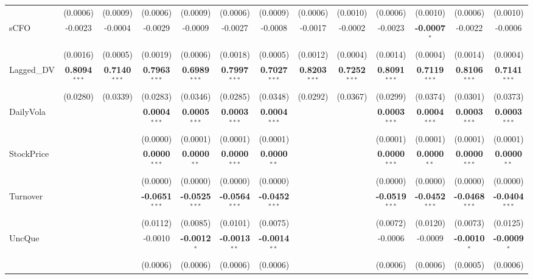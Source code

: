 \documentclass[11pt,a4paper]{article}
\begin{document}
\begin{table}[htbp]
\begin{tabular}{lcccccccccccc}
 & (0.0006) & (0.0009) & (0.0006) & (0.0009) & (0.0006) & (0.0009) & (0.0006) & (0.0010) & (0.0006) & (0.0010) & (0.0006) & (0.0010) \\
sCFO & -0.0023 & -0.0004 & -0.0029 & -0.0009 & -0.0027 & -0.0008 & -0.0017 & -0.0002 & -0.0023 & \textbf{-0.0007}$^{*}$ & -0.0022 & -0.0006 \\
 & (0.0016) & (0.0005) & (0.0019) & (0.0006) & (0.0018) & (0.0005) & (0.0012) & (0.0004) & (0.0014) & (0.0004) & (0.0014) & (0.0004) \\
Lagged\_DV & \textbf{0.8094}$^{***}$ & \textbf{0.7140}$^{***}$ & \textbf{0.7963}$^{***}$ & \textbf{0.6989}$^{***}$ & \textbf{0.7997}$^{***}$ & \textbf{0.7027}$^{***}$ & \textbf{0.8203}$^{***}$ & \textbf{0.7252}$^{***}$ & \textbf{0.8091}$^{***}$ & \textbf{0.7119}$^{***}$ & \textbf{0.8106}$^{***}$ & \textbf{0.7141}$^{***}$ \\
 & (0.0280) & (0.0339) & (0.0283) & (0.0346) & (0.0285) & (0.0348) & (0.0292) & (0.0367) & (0.0299) & (0.0374) & (0.0301) & (0.0373) \\
DailyVola &  &  & \textbf{0.0004}$^{***}$ & \textbf{0.0005}$^{***}$ & \textbf{0.0003}$^{***}$ & \textbf{0.0004}$^{***}$ &  &  & \textbf{0.0003}$^{***}$ & \textbf{0.0004}$^{***}$ & \textbf{0.0003}$^{***}$ & \textbf{0.0003}$^{***}$ \\
 &  &  & (0.0000) & (0.0001) & (0.0001) & (0.0001) &  &  & (0.0001) & (0.0001) & (0.0001) & (0.0001) \\
StockPrice &  &  & \textbf{0.0000}$^{***}$ & \textbf{0.0000}$^{**}$ & \textbf{0.0000}$^{***}$ & \textbf{0.0000}$^{**}$ &  &  & \textbf{0.0000}$^{***}$ & \textbf{0.0000}$^{**}$ & \textbf{0.0000}$^{***}$ & \textbf{0.0000}$^{**}$ \\
 &  &  & (0.0000) & (0.0000) & (0.0000) & (0.0000) &  &  & (0.0000) & (0.0000) & (0.0000) & (0.0000) \\
Turnover &  &  & \textbf{-0.0651}$^{***}$ & \textbf{-0.0525}$^{***}$ & \textbf{-0.0564}$^{***}$ & \textbf{-0.0452}$^{***}$ &  &  & \textbf{-0.0519}$^{***}$ & \textbf{-0.0452}$^{***}$ & \textbf{-0.0468}$^{***}$ & \textbf{-0.0404}$^{***}$ \\
 &  &  & (0.0112) & (0.0085) & (0.0101) & (0.0075) &  &  & (0.0072) & (0.0120) & (0.0073) & (0.0125) \\
UncQue &  &  & -0.0010 & \textbf{-0.0012}$^{*}$ & \textbf{-0.0013}$^{**}$ & \textbf{-0.0014}$^{**}$ &  &  & -0.0006 & -0.0009 & \textbf{-0.0010}$^{*}$ & \textbf{-0.0009}$^{*}$ \\
 &  &  & (0.0006) & (0.0006) & (0.0006) & (0.0006) &  &  & (0.0006) & (0.0006) & (0.0005) & (0.0006) \\

\end{tabular}
\end{table}
\end{document}
